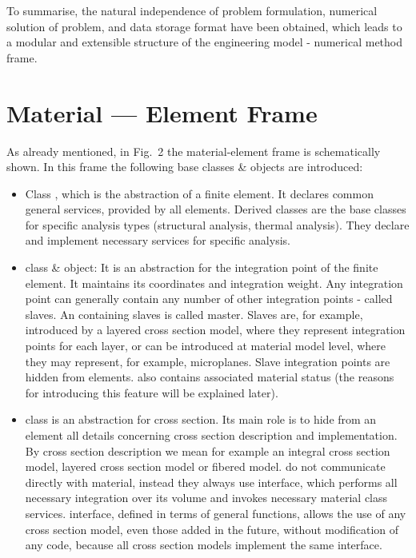 \begin{htmlonly}
\begin{center}
To summarise, the natural independence of  problem formulation,
numerical solution of  problem, and data storage format have been
obtained, which leads to a modular and extensible structure of the engineering
model - numerical method frame.



\section{Material --- Element Frame}
\label{materialEleemntFrame}
As already mentioned, in Fig.~2 the material-element
frame is schematically shown.
In this frame the following base classes \&
objects are introduced:


\begin{itemize}
\item
Class , which is the abstraction of a finite element. It declares
common general services, provided by all elements. Derived
classes are the base classes for specific analysis types (structural
analysis, thermal analysis).  They declare and implement necessary services for
specific analysis.

\item
{} class \& object: It is an abstraction for
the integration
point of the finite element. It maintains its coordinates and integration
weight. Any integration point can generally contain any number of
other integration points - called slaves. An  containing slaves is called master. Slaves are, for example,
introduced by a layered cross section model, where they represent
integration points for each layer, or can be introduced at material
model level, where they may represent, for example, microplanes. Slave
integration points are hidden from elements. 
also contains associated material status (the reasons for introducing
this feature will be explained later).

\item
{} class is an abstraction for cross section. Its
main role is to hide from an element all details concerning cross
section description and implementation. By cross section description
we mean for example an integral cross section model, layered cross
section model or fibered model.  do not communicate directly
with material, instead they always use  interface, which
performs all necessary integration over its volume and invokes
necessary material class services.  interface, defined in
terms of general functions, allows the use of any cross section
model, even those added in the future, without modification of any code,
because all cross section models implement the same interface.



\end{itemize}
\end{center}
\end{htmlonly}
